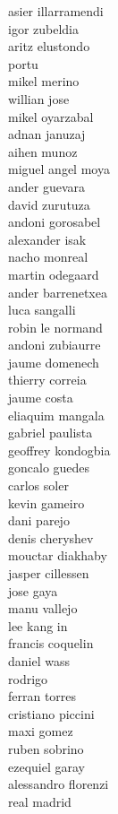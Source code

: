 \documentclass[]{article}
\begin{document}
{asier illarramendi\\
igor zubeldia\\
aritz elustondo\\
portu\\
mikel merino\\
willian jose\\
mikel oyarzabal\\
adnan januzaj\\
aihen munoz\\
miguel angel moya\\
ander guevara\\
david zurutuza\\
andoni gorosabel\\
alexander isak\\
nacho monreal\\
martin odegaard\\
ander barrenetxea\\
luca sangalli\\
robin le normand\\
andoni zubiaurre\\
jaume domenech\\
thierry correia\\
jaume costa\\
eliaquim mangala\\
gabriel paulista\\
geoffrey kondogbia\\
goncalo guedes\\
carlos soler\\
kevin gameiro\\
dani parejo\\
denis cheryshev\\
mouctar diakhaby\\
jasper cillessen\\
jose gaya\\
manu vallejo\\
lee kang in\\
francis coquelin\\
daniel wass\\
rodrigo\\
ferran torres\\
cristiano piccini\\
maxi gomez\\
ruben sobrino\\
ezequiel garay\\
alessandro florenzi\\
real madrid\\
}
\end{document}
